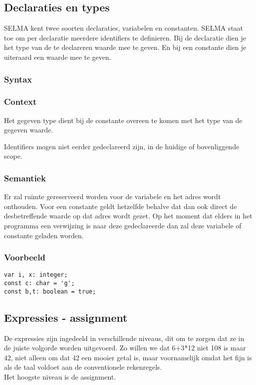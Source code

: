 \documentclass[]{article}
\begin{document}
\subsection{Declaraties en types}
SELMA kent twee soorten declaraties, variabelen en constanten. SELMA staat toe om per declaratie meerdere identifiers te definieren. Bij de declaratie dien je het type van de te declareren waarde mee te geven. En bij een constante dien je uiteraard een waarde mee te geven.
\subsubsection{Syntax}

\subsubsection{Context}
\begin{list}{•}{•}
\item Het gegeven type dient bij de constante overeen te komen met het type van de gegeven waarde.
\item Identifiers mogen niet eerder gedeclareerd zijn, in de huidige of bovenliggende scope.
\end{list}
\subsubsection{Semantiek}
Er zal ruimte gereserveerd worden voor de variabele en het adres wordt onthouden. Voor een constante geldt hetzelfde behalve dat dan ook direct de desbetreffende waarde op dat adres wordt gezet. Op het moment dat elders in het programma een verwijzing is naar deze gedeclareerde dan zal deze variabele of constante geladen worden.
\subsubsection{Voorbeeld}
\begin{lstlisting}[style=SELMA]
var i, x: integer;
const c: char = 'g';
const b,t: boolean = true;
\end{lstlisting}

\subsection{Expressies - assignment}
De expressies zijn ingedeeld in verschillende niveaus, dit om te zorgen dat ze in de juiste volgorde worden uitgevoerd. Zo willen we dat 6+3*12 niet 108 is maar 42, niet alleen om dat 42 een mooier getal is, maar voornamelijk omdat het fijn is als de taal voldoet aan de conventionele rekenregels. \\
Het hoogste niveau is de assignment.
\end{document}
